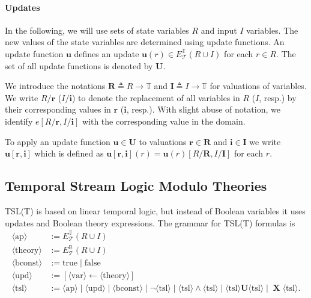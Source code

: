 \documentclass[runningheads]{llncs}
\newcommand{\false}{\mathrm{false}}
\newcommand{\until}{\mathrel{\mathbf{U}}}
\newcommand{\lnext}{\operatorname{\mathbf{X}}}
\newcommand{\theory}{\mathcal{T}}
\newcommand{\tdomain}{\mathbb{T}}
\newcommand{\updf}{\mathbf{u}}
\newcommand{\updfs}{\mathbf{U}}
\newcommand{\rvar}{\mathbf{r}}
\newcommand{\rvars}{\mathbf{R}}
\newcommand{\ivar}{\mathbf{i}}
\newcommand{\ivars}{\mathbf{I}}
\newcommand{\true}{\mathrm{true}}
\newcommand{\bexpr}{E_\theory^\mathbb{B}(R \cup I)}
\newcommand{\texpr}{E_\theory^\tdomain(R \cup I)}
\newcommand{\nt}[1]{\langle\text{#1}\rangle}
\begin{document}
\paragraph{Updates}
In the following, we will use sets of state variables $R$ and input $I$ variables. The new values of the state variables are determined using update functions. An update function $\updf$ defines an update $\updf(r) \in \texpr$ for each $r \in R$. The set of all update functions is denoted by $\updfs$.


We introduce the notations $\rvars \triangleq R \to \tdomain$ and $\ivars \triangleq I \to \tdomain$ for valuations of variables. We write $R/\rvar$ ($I/\ivar$) to denote the replacement of all variables in $R$ ($I$, resp.) by their corresponding values in $\rvar$ ($\ivar$, resp.). With slight abuse of notation, we identify $e[R/\rvar, I/\ivar]$ with the corresponding value in the domain.

To apply an update function $\updf \in \updfs$ to valuations $\rvar \in \rvars$ and $\ivar \in \ivars$  we write $\updf[\rvar,\ivar]$ which is defined as $\updf[\rvar,\ivar](r) = \updf(r)[R/\rvars, I/\ivars]$ for each $r$.

\subsection{Temporal Stream Logic Modulo Theories}
TSL(T) is based on linear temporal logic, but instead of Boolean variables it uses updates and Boolean theory expressions.
The grammar for TSL(T) formulas is
\begin{align*}
    \nt{ap} &:= \texpr\\
    \nt{theory} &:= \bexpr\\
    \nt{bconst} &:= \true \mid \false\\
    \nt{upd} &:= [ \nt{var} \leftarrow \nt{theory}]\\
    \nt{tsl} &:= \nt{ap} \mid \nt{upd} \mid \nt{bconst} \mid \neg \nt{tsl} \mid  \nt{tsl} \land \nt{tsl} \mid \nt{tsl} \until \nt{tsl} \mid \lnext \nt{tsl}.
\end{align*}
\end{document}
